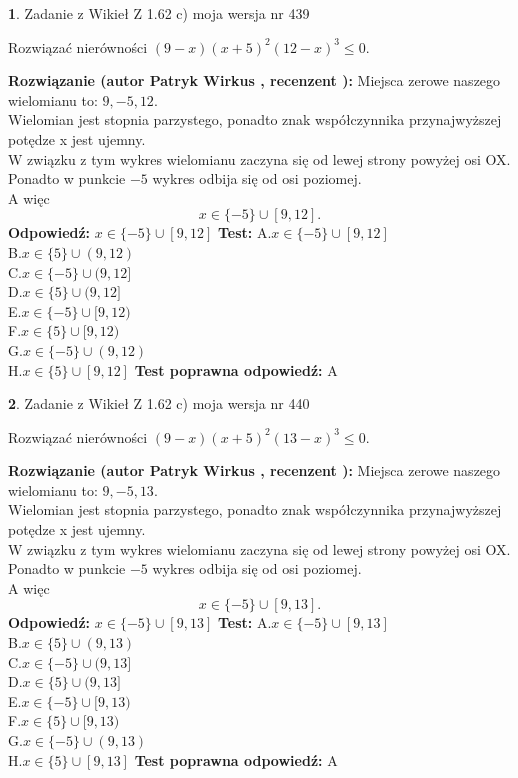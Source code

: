 \documentclass[12pt, a4paper]{article}
\theoremstyle{definition} %
\newtheorem{zad}{}
\newcommand{\zadStart}[1]{\begin{zad}#1\newline}
\newcommand{\zadStop}{\end{zad}}
\newcommand{\rozwStart}[2]{\noindent \textbf{Rozwiązanie (autor #1 , recenzent #2): }\newline}
\newcommand{\rozwStop}{\newline}
\newcommand{\odpStart}{\noindent \textbf{Odpowiedź:}\newline}
\newcommand{\odpStop}{\newline}
\newcommand{\testStart}{\noindent \textbf{Test:}\newline}
\newcommand{\testStop}{\newline}
\newcommand{\kluczStart}{\noindent \textbf{Test poprawna odpowiedź:}\newline}
\newcommand{\kluczStop}{\newline}
\begin{document}
\zadStart{Zadanie z Wikieł Z 1.62 c) moja wersja nr 439}

Rozwiązać nierówności $(9-x)(x+5)^{2}(12-x)^{3}\le0$.
\zadStop
\rozwStart{Patryk Wirkus}{}
Miejsca zerowe naszego wielomianu to: $9, -5, 12$.\\
Wielomian jest stopnia parzystego, ponadto znak współczynnika przy\linebreak najwyższej potędze x jest ujemny.\\ W związku z tym wykres wielomianu zaczyna się od lewej strony powyżej osi OX.\\
Ponadto w punkcie $-5$ wykres odbija się od osi poziomej.\\
A więc $$x \in \{-5\} \cup [9,12].$$
\rozwStop
\odpStart
$x \in \{-5\} \cup [9,12]$
\odpStop
\testStart
A.$x \in \{-5\} \cup [9,12]$\\
B.$x \in \{5\} \cup (9,12)$\\
C.$x \in \{-5\} \cup (9,12]$\\
D.$x \in \{5\} \cup (9,12]$\\
E.$x \in \{-5\} \cup [9,12)$\\
F.$x \in \{5\} \cup [9,12)$\\
G.$x \in \{-5\} \cup (9,12)$\\
H.$x \in \{5\} \cup [9,12]$
\testStop
\kluczStart
A
\kluczStop



\zadStart{Zadanie z Wikieł Z 1.62 c) moja wersja nr 440}

Rozwiązać nierówności $(9-x)(x+5)^{2}(13-x)^{3}\le0$.
\zadStop
\rozwStart{Patryk Wirkus}{}
Miejsca zerowe naszego wielomianu to: $9, -5, 13$.\\
Wielomian jest stopnia parzystego, ponadto znak współczynnika przy\linebreak najwyższej potędze x jest ujemny.\\ W związku z tym wykres wielomianu zaczyna się od lewej strony powyżej osi OX.\\
Ponadto w punkcie $-5$ wykres odbija się od osi poziomej.\\
A więc $$x \in \{-5\} \cup [9,13].$$
\rozwStop
\odpStart
$x \in \{-5\} \cup [9,13]$
\odpStop
\testStart
A.$x \in \{-5\} \cup [9,13]$\\
B.$x \in \{5\} \cup (9,13)$\\
C.$x \in \{-5\} \cup (9,13]$\\
D.$x \in \{5\} \cup (9,13]$\\
E.$x \in \{-5\} \cup [9,13)$\\
F.$x \in \{5\} \cup [9,13)$\\
G.$x \in \{-5\} \cup (9,13)$\\
H.$x \in \{5\} \cup [9,13]$
\testStop
\kluczStart
A
\kluczStop
\end{document}
